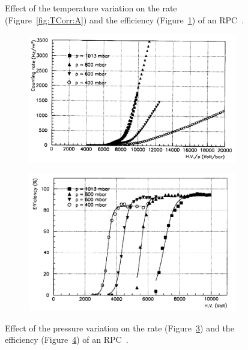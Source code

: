 \begin{figure}[H]
\begin{subfigure}{0.5\linewidth}
			\caption{\label{fig:TCorr:B}}
		\end{subfigure}
		\caption{\label{fig:TCorr} Effect of the temperature variation on the rate (Figure~\ref{fig:TCorr:A}) and the efficiency (Figure~\ref{fig:TCorr:B}) of an RPC~\cite{ABBRESCIA1995}.}
	\end{figure}
	
	\begin{figure}[H]
		\begin{subfigure}{\linewidth}
			\centering
			\includegraphics[width = 0.7\plotwidth]{fig/chapt4/Rate-pressure.png}\\
			\caption{\label{fig:PCorr:A}}
		\end{subfigure}
		\begin{subfigure}{\linewidth}
		    \centering
			\includegraphics[width = 0.7\plotwidth]{fig/chapt4/Efficiency-pressure.png}
			\caption{\label{fig:PCorr:B}}
		\end{subfigure}
		\caption{\label{fig:PCorr} Effect of the pressure variation on the rate (Figure~\ref{fig:PCorr:A}) and the efficiency (Figure~\ref{fig:PCorr:B}) of an RPC~\cite{ABBRESCIA1997PRES}.}
	\end{figure}
	
